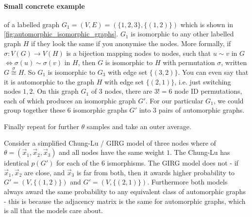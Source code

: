 \paragraph{Small concrete example} of a labelled graph $G_1 = (V, E) = (\{1, 2, 3\}, \{(1,2)\})$ which is shown in \cref{fig:automorphic_isomorphic_graphs}. $G_1$ is isomorphic to any other labelled graph $H$ if they look the same if you anonymise the nodes.
More formally, if $\sigma: V(G) \to V(H)$ is a bijection mapping nodes to nodes, such that $u \sim v$ in $G$ $\iff \sigma(u) \sim \sigma(v)$ in $H$, then $G$ is isomorphic to $H$ with permutation $\sigma$, written $G \stackrel{\sigma}{\cong} H$.
So $G_1$ is isomorphic to $G_3$ with edge set $\{(3,2)\}$. You can even say that it is automorphic to the graph $H$ with edge set $\{(2, 1)\}$, i.e. just switching nodes $1,2$.
On this graph $G_1$ of 3 nodes, there are $3! = 6$ node ID permutations, each of which produces an isomorphic graph $G'$. For our particular $G_1$, we could group together these 6 isomorphic graphs $G'$ into 3 pairs of automorphic graphs.

Finally repeat for further $\theta$ samples and take an outer average.


Consider a simplified Chung-Lu / GIRG model of three nodes where of $\theta = (\vec{x}_1, \vec{x}_2, \vec{x}_3)$ and all nodes have the same weight $1$.
The Chung-Lu has identical $p(G')$ for each of the 6 ismorphisms.
The GIRG  model does not - if $\vec{x}_1, \vec{x}_2$ are close, and $\vec{x}_3$ is far from both, then it awards higher probability to $G' = (V, \{(1,2)\})$ and $G' = (V, \{(2, 1)\})$.
Furthermore both models always award the same probability to any equivalent class of automorphic graphs - this is because the adjacency matrix is the same for automorphic graphs, which is all that the models care about.

